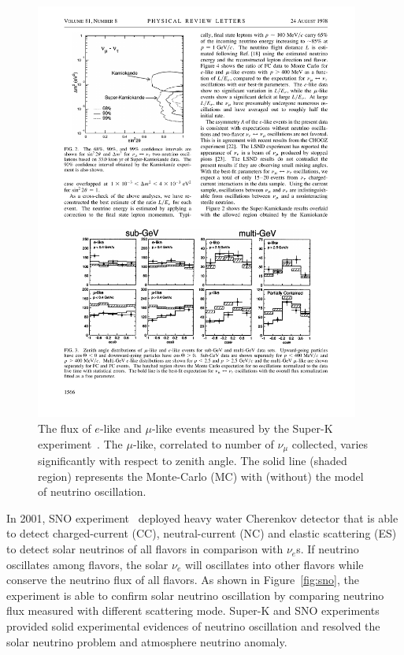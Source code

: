 \begin{figure}[h!]
\centering
\includegraphics[width=0.95\textwidth]{Figures/SuperK.pdf}
\caption[Atmosphere neutrino oscillation]{The flux of $e$-like and $\mu$-like events measured by the Super-K experiment~\cite{bib:SuperK}. 
The $\mu$-like, correlated to number of $\nu_\mu$ collected, varies significantly with respect to zenith angle. 
The solid line (shaded region) represents the Monte-Carlo (MC) with (without) the model of neutrino oscillation.  }
\label{fig:SuperK}
\end{figure}

    In 2001, SNO experiment~\cite{bib:SNO} deployed heavy water Cherenkov detector that is able to detect charged-current (CC), neutral-current (NC) and elastic scattering (ES) to detect solar neutrinos of all flavors in comparison with $\nu_e$s.
    If neutrino oscillates among flavors, the solar $\nu_e$ will oscillates into other flavors while conserve the  neutrino flux of all flavors.
    As shown in Figure~\ref{fig:sno}, the experiment is able to confirm solar neutrino oscillation by comparing neutrino flux measured with different scattering mode.
    Super-K and SNO experiments provided solid experimental evidences of neutrino oscillation and resolved the solar neutrino problem and atmosphere neutrino anomaly.
    
